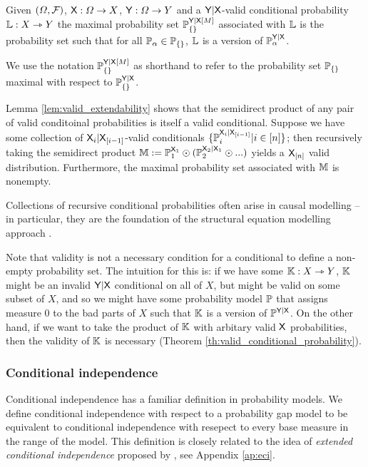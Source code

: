 \begin{definition}
Given $(\Omega,\mathcal{F})$, $\mathsf{X}:\Omega\to X$, $\mathsf{Y}:\Omega\to Y$ and a $\mathsf{Y}|\mathsf{X}$-valid conditional probability $\mathbb{L}:X\rightarrowtriangle Y$ the maximal probability set $\mathbb{P}_{\{\}}^{\mathsf{Y}|\mathsf{X}[M]}$ associated with $\mathbb{L}$ is the probability set such that for all $\mathbb{P}_\alpha\in \mathbb{P}_{\{\}}$, $\mathbb{L}$ is a version of $\mathbb{P}_\alpha^{\mathsf{Y}|\mathsf{X}}$.
\end{definition}

We use the notation $\mathbb{P}_{\{\}}^{\mathsf{Y}|\mathsf{X}[M]}$ as shorthand to refer to the probability set $\mathbb{P}_{\{\}}$ maximal with respect to $\mathbb{P}_{\{\}}^{\mathsf{Y}|\mathsf{X}}$.

Lemma \ref{lem:valid_extendability} shows that the semidirect product of any pair of valid conditoinal probabilities is itself a valid conditional. Suppose we have some collection of $\mathsf{X}_i|\mathsf{X}_{[i-1]}$-valid conditionals $\{\mathbb{P}_i^{\mathsf{X}_i|\mathsf{X}_{[i-1]}}|i\in [n]\}$; then recursively taking the semidirect product $\mathbb{M}:=\mathbb{P}_1^{\mathsf{X}_1}\odot (\mathbb{P}_2^{\mathsf{X}_2|\mathsf{X}_{1}}\odot ...)$ yields a $\mathsf{X}_{[n]}$ valid distribution. Furthermore, the maximal probability set associated with $\mathbb{M}$ is nonempty.

Collections of recursive conditional probabilities often arise in causal modelling -- in particular, they are the foundation of the structural equation modelling approach \citet{richardson2013single,pearl_causality:_2009}.

Note that validity is not a necessary condition for a conditional to define a non-empty probability set. The intuition for this is: if we have some $\mathbb{K}:X\rightarrowtriangle Y$, $\mathbb{K}$ might be an invalid $\mathsf{Y}|\mathsf{X}$ conditional on all of $X$, but might be valid on some subset of $X$, and so we might have some probability model $\mathbb{P}$ that assigns measure 0 to the bad parts of $X$ such that $\mathbb{K}$ is a version of $\mathbb{P}^{\mathsf{Y}|\mathsf{X}}$. On the other hand, if we want to take the product of $\mathbb{K}$ with arbitary valid $\mathsf{X}$ probabilities, then the validity of $\mathbb{K}$ is necessary (Theorem \ref{th:valid_conditional_probability}).

\subsubsection{Conditional independence}\label{ssec:cond_indep}

Conditional independence has a familiar definition in probability models. We define conditional independence with respect to a probability gap model to be equivalent to conditional independence with resepect to every base measure in the range of the model. This definition is closely related to the idea of \emph{extended conditional independence} proposed by \citet{constantinou_extended_2017}, see Appendix \ref{ap:eci}.

